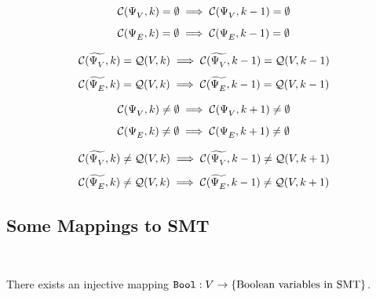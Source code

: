 \begin{theorem}
	\[\begin{array}{l}
		\mathcal{C}(\Psi^{}_{V},k) = \emptyset \implies \mathcal{C}(\Psi^{}_{V},k - 1) = \emptyset \\ [8pt]
		\mathcal{C}(\Psi^{}_{E},k) = \emptyset \implies \mathcal{C}(\Psi^{}_{E},k - 1) = \emptyset
	\end{array}\]
\end{theorem}

\begin{corollary}
	\[\begin{array}{l}
		\mathcal{C}(\widetilde{\Psi^{}_{V}},k) = \mathcal{Q}(V,k) \implies \mathcal{C}(\widetilde{\Psi^{}_{V}},k - 1) = \mathcal{Q}(V,k - 1) \\ [8pt]
		\mathcal{C}(\widetilde{\Psi^{}_{E}},k) = \mathcal{Q}(V,k) \implies \mathcal{C}(\widetilde{\Psi^{}_{E}},k - 1) = \mathcal{Q}(V,k - 1)
	\end{array}\]
\end{corollary}

\begin{theorem}
	\[\begin{array}{l}
		\mathcal{C}(\Psi^{}_{V},k) \neq \emptyset \implies \mathcal{C}(\Psi^{}_{V},k + 1) \neq \emptyset \\ [8pt]
		\mathcal{C}(\Psi^{}_{E},k) \neq \emptyset \implies \mathcal{C}(\Psi^{}_{E},k + 1) \neq \emptyset
	\end{array}\]
\end{theorem}

\begin{corollary}
	\[\begin{array}{l}
		\mathcal{C}(\widetilde{\Psi^{}_{V}},k) \neq \mathcal{Q}(V,k) \implies \mathcal{C}(\widetilde{\Psi^{}_{V}},k - 1) \neq \mathcal{Q}(V,k + 1) \\ [8pt]
		\mathcal{C}(\widetilde{\Psi^{}_{E}},k) \neq \mathcal{Q}(V,k) \implies \mathcal{C}(\widetilde{\Psi^{}_{E}},k - 1) \neq \mathcal{Q}(V,k + 1)
	\end{array}\]
\end{corollary}

\cleardoublepage
\subsection{Some Mappings to SMT}

\begin{definition}
	\ \begin{center}
		There exists an injective mapping \(\mathtt{Bool}: V \to \{\text{Boolean variables in SMT}\}\).
	\end{center}
\end{definition}

